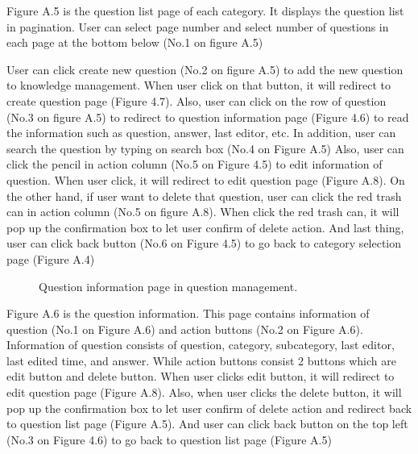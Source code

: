 \documentclass[12pt,oneside,openright,a4paper]{cpe-english-project}
\begin{document}
Figure A.5 is the question list page of each category. It displays the question list in 
pagination. User can select page number and select number of questions in each page at the 
bottom below (No.1 on figure A.5)

User can click create new question (No.2 on figure A.5) to add the new question to 
knowledge management. When user click on that button, it will redirect to create question 
page (Figure 4.7). Also, user can click on the row of question (No.3 on figure A.5) to redirect 
to question information page (Figure 4.6) to read the information such as question, answer, 
last editor, etc. In addition, user can search the question by typing on search box (No.4 on 
Figure A.5)
Also, user can click the pencil in action column (No.5 on Figure 4.5) to edit 
information of question. When user click, it will redirect to edit question page (Figure A.8). 
On the other hand, if user want to delete that question, user can click the red trash can in 
action column (No.5 on figure A.8). When click the red trash can, it will pop up the 
confirmation box to let user confirm of delete action.
And last thing, user can click back button (No.6 on Figure 4.5) to go back to category 
selection page (Figure A.4)

\begin{figure}[!h]\centering
{}
\caption{Question information page in question management.
}\label{fig:Question information page in question management.
}
\end{figure}

Figure A.6 is the question information. This page contains information of question 
(No.1 on Figure A.6) and action buttons (No.2 on Figure A.6).
Information of question consists of question, category, subcategory, last editor, last 
edited time, and answer. While action buttons consist 2 buttons which are edit button and 
delete button. When user clicks edit button, it will redirect to edit question page (Figure A.8). 
Also, when user clicks the delete button, it will pop up the confirmation box to let user 
confirm of delete action and redirect back to question list page (Figure A.5). And user can 
click back button on the top left (No.3 on Figure 4.6) to go back to question list page (Figure 
A.5)
\end{document}
